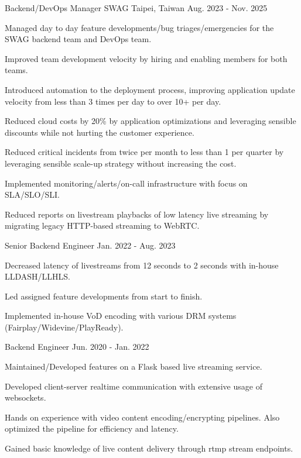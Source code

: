 \begin{cventries}
  \cventry
    {Backend/DevOps Manager} %
    {SWAG} %
    {Taipei, Taiwan} %
    {Aug. 2023 - Nov. 2025} %
    {
      \begin{cvitems} %
        \item {Managed day to day feature developments/bug triages/emergencies for the SWAG backend team and DevOps team. }
        \item {Improved team development velocity by hiring and enabling members for both teams. }
        \item {Introduced automation to the deployment process, improving application update velocity from less than 3 times per day to over 10+ per day. }
        \item {Reduced cloud costs by 20\% by application optimizations and leveraging sensible discounts while not hurting the customer experience. }
        \item {Reduced critical incidents from twice per month to less than 1 per quarter by leveraging sensible scale-up strategy without increasing the cost. }
        \item {Implemented monitoring/alerts/on-call infrastructure with focus on SLA/SLO/SLI. }
        \item {Reduced reports on livestream playbacks of low latency live streaming by migrating legacy HTTP-based streaming to WebRTC. }
      \end{cvitems}
    }

  \cventry
    {Senior Backend Engineer} %
    {} %
    {} %
    {Jan. 2022 - Aug. 2023} %
    {
      \begin{cvitems} %
        \item {Decreased latency of livestreams from 12 seconds to 2 seconds with in-house LLDASH/LLHLS. }
        \item {Led assigned feature developments from start to finish. }
        \item {Implemented in-house VoD encoding with various DRM systems (Fairplay/Widevine/PlayReady). }
      \end{cvitems}
    }

  \cventry
    {Backend Engineer} %
    {} %
    {} %
    {Jun. 2020 - Jan. 2022} %
    {
      \begin{cvitems} %
        \item {Maintained/Developed features on a Flask based live streaming service. }
        \item {Developed client-server realtime communication with extensive usage of websockets. }
        \item {Hands on experience with video content encoding/encrypting pipelines. Also optimized the pipeline for efficiency and latency. }
        \item {Gained basic knowledge of live content delivery through rtmp stream endpoints.}
      \end{cvitems}
    }


\end{cventries}
